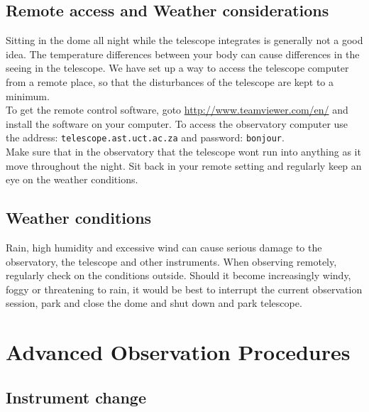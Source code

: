 \documentclass[12pt,twoside,a4paper]{report}
\begin{document}
\section{Remote access and Weather considerations}
\label{remote_obs}

Sitting in the dome all night while the telescope integrates is generally not a good idea. 
The temperature differences between your body can cause differences in the seeing in the telescope. 
We have set up a way to access the telescope computer from a remote place, so that the disturbances 
of the telescope are kept to a minimum.\\

To get the remote control software, goto \url{http://www.teamviewer.com/en/} and install 
the software on your computer. To access the observatory computer use the address:\newline
{\tt telescope.ast.uct.ac.za} and password: {\tt bonjour}.\\

Make sure that in the observatory that the telescope wont run into anything 
as it move throughout the night. Sit back in your remote setting and regularly keep an eye 
on the weather conditions. \\

\section{Weather conditions}

Rain, high humidity and excessive wind can cause serious damage to the observatory, the telescope and other instruments. When observing remotely, regularly check on the conditions outside. Should it become increasingly windy, foggy or threatening to rain, it would be best to interrupt the current observation session, park and close the dome and shut down and park telescope.





\chapter{Advanced Observation Procedures}

\section{Instrument change}
\end{document}
